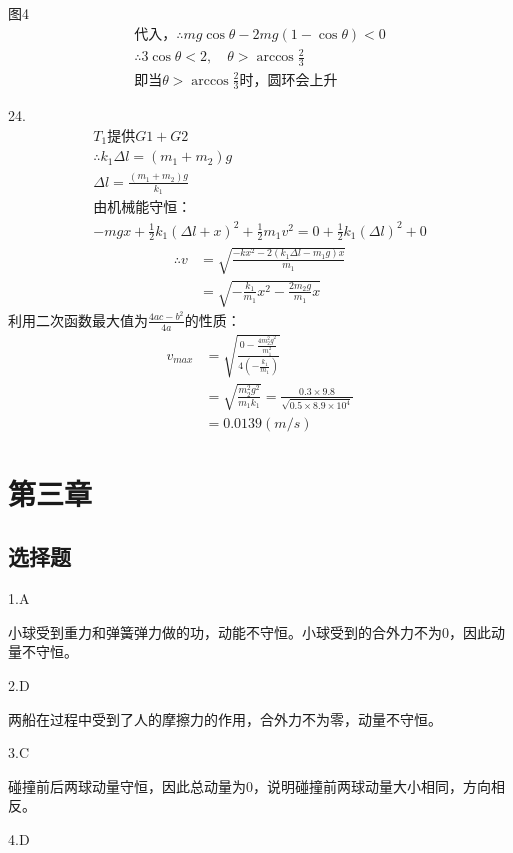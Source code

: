 \documentclass[blue, normal]{./templete/qyxfnote}
\begin{document}
\begin{multicols}{2}
	图4
	\begin{gather*}
	\text{代入，}\therefore mg\cos\theta-2mg(1-\cos\theta)<0\\
	\therefore 3\cos\theta<2,\quad \theta>\arccos\frac{2}{3}\\
	\text{即当}\theta>\arccos\frac{2}{3}\text{时，圆环会上升}
	\end{gather*}
	\raggedright
	24.
	\begin{gather*}
	T_1\text{提供}G1+G2\\
	\therefore k_1\Delta l=(m_1+m_2)g\\
	\Delta l=\frac{(m_1+m_2)g}{k_1}\\
	\text{由机械能守恒：}\\
	-mgx+\frac{1}{2}k_1(\Delta l+x)^2+\frac{1}{2}m_1v^2=0+\frac{1}{2}k_1(\Delta l)^2+0
	\end{gather*}
	\begin{align*}
	\therefore v&=\sqrt{\frac{-kx^2-2(k_1\Delta l-m_1g)x}{m_1}}\\
	&=\sqrt{-\frac{k_1}{m_1}x^2-\frac{2m_2g}{m_1}x}
	\end{align*}
	利用二次函数最大值为$\frac{4ac-b^2}{4a}$的性质：
	\begin{align*}
	v_{max}	&=\sqrt{\frac{0-\frac{4m_2^2g^2}{m_1^2}}{4\left(-\frac{k_1}{m_1}\right)}}\\
	&=\sqrt{\frac{m_2^2g^2}{m_1k_1}}=\frac{0.3\times 9.8}{\sqrt{0.5\times 8.9\times 10^4}}\\
	&=0.0139(m/s)
	\end{align*}


	
	\section{第三章}
	

		\subsection{选择题}
			1.A
			
			小球受到重力和弹簧弹力做的功，动能不守恒。小球受到的合外力不为0，因此动量不守恒。
			
			2.D
			
			两船在过程中受到了人的摩擦力的作用，合外力不为零，动量不守恒。
			
			3.C
			
			碰撞前后两球动量守恒，因此总动量为0，说明碰撞前两球动量大小相同，方向相反。
			
			4.D
			

\end{multicols}
\end{document}
